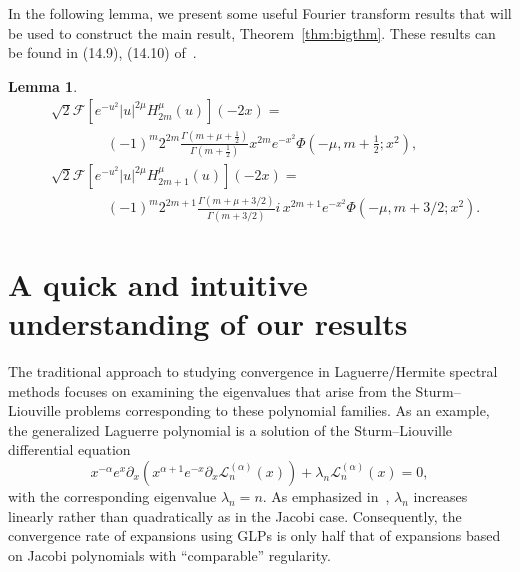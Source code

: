 \documentclass[pdflatex,sn-aps]{sn-jnl}%
\theoremstyle{thmstyleone}%
\newtheorem{lemma}{Lemma}[section]
\theoremstyle{thmstyletwo}%
\theoremstyle{thmstylethree}%
\begin{document}
In the following lemma, we present some useful Fourier transform results that will be used
to construct the main result, Theorem~\ref{thm:bigthm}.
These results can be found in (14.9), (14.10) of~\cite{chihara1955generalized}.
\begin{lemma}\label{lem:transform}
  \begin{equation}\label{eq:0823-2}
    \begin{aligned}
    & \sqrt{2}\mathcal{F}\left[e^{-u^2}|u|^{2 \mu} H_{2 m}^\mu(u)\right](-2x)= \\
    & \qquad\qquad(-1)^m 2^{2 m} \frac{\Gamma\left(m+\mu+\frac{1}{2}\right)}{\Gamma\left(m+\frac{1}{2}\right)} x^{2 m} e^{-x^2} \Phi\left(-\mu, m+\frac{1}{2} ; x^2\right), \\
    & \sqrt{2}\mathcal{F}\left[e^{-u^2}|u|^{2 \mu} H_{2 m+1}^\mu(u)\right](-2x)= \\
    & \qquad \qquad(-1)^m 2^{2 m+1} \frac{\Gamma(m+\mu+3 / 2)}{\Gamma(m+3 / 2)} i\, x^{2 m+1} e^{-x^2} \Phi\left(-\mu, m+3 / 2 ; x^2\right) .
    \end{aligned}
  \end{equation}
\end{lemma}

\section{A quick and intuitive understanding of our results}
\label{sec:intuitive}
The traditional approach to studying convergence in Laguerre/Hermite spectral methods focuses on examining the eigenvalues that arise from the Sturm--Liouville problems corresponding to these polynomial families. 
As an example, the generalized Laguerre polynomial is a solution of the Sturm--Liouville differential equation
\begin{equation}
  x^{-\alpha} e^x \partial_x\left(x^{\alpha+1} e^{-x} \partial_x \mathscr{L}_n^{(\alpha)}(x)\right)+\lambda_n \mathscr{L}_n^{(\alpha)}(x)=0,
\end{equation}
with the corresponding eigenvalue $\lambda_n = n$. As emphasized in~\cite{shen2011spectral}, $\lambda_n$ increases linearly rather than quadratically as in the Jacobi case. Consequently, the convergence rate of expansions using GLPs is only half that of expansions based on Jacobi polynomials with ``comparable'' regularity.
\end{document}
